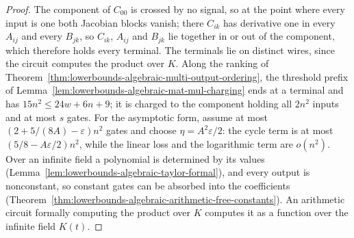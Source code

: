 \begin{proof}
  The component of $C_{00}$ is crossed by no signal, so at the point where
  every input is one both Jacobian blocks vanish; there $C_{ik}$ has
  derivative one in every $A_{ij}$ and every $B_{jk}$, so $C_{ik}$, $A_{ij}$
  and $B_{jk}$ lie together in or out of the component, which therefore
  holds every terminal. The terminals lie on distinct wires, since the
  circuit computes the product over $K$. Along the ranking of
  Theorem~\ref{thm:lowerbounds-algebraic-multi-output-ordering}, the
  threshold prefix of Lemma~\ref{lem:lowerbounds-algebraic-mat-mul-charging}
  ends at a terminal and has $15n^2\le24w+6n+9$; it is charged to the
  component holding all $2n^2$ inputs and at most $s$ gates. For the
  asymptotic form, assume at most $(2+5/(8A)-\varepsilon)n^2$ gates and
  choose $\eta=A^2\varepsilon/2$: the cycle term is at most
  $(5/8-A\varepsilon/2)n^2$, while the linear loss and the logarithmic term
  are $o(n^2)$. Over an infinite field a polynomial is determined by its
  values (Lemma~\ref{lem:lowerbounds-algebraic-taylor-formal}), and every
  output is nonconstant, so constant gates can be absorbed into the
  coefficients
  (Theorem~\ref{thm:lowerbounds-algebraic-arithmetic-free-constants}). An
  arithmetic circuit formally computing the product over $K$ computes it as
  a function over the infinite field $K(t)$.
\end{proof}

